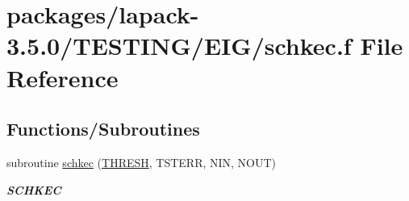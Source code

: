 \hypertarget{schkec_8f}{}\section{packages/lapack-\/3.5.0/\+T\+E\+S\+T\+I\+N\+G/\+E\+I\+G/schkec.f File Reference}
\label{schkec_8f}
\subsection*{Functions/\+Subroutines}
\begin{DoxyCompactItemize}
\item 
subroutine \hyperlink{group__single__eig_ga59636355218ca7955eee8e253db3329a}{schkec} (\hyperlink{zlaqgs_8c_a0656018abfc9fa2821827415f5d5ea57}{T\+H\+R\+E\+S\+H}, T\+S\+T\+E\+R\+R, N\+I\+N, N\+O\+U\+T)
\begin{DoxyCompactList}\small\item\em {\bfseries S\+C\+H\+K\+E\+C} \end{DoxyCompactList}\end{DoxyCompactItemize}

